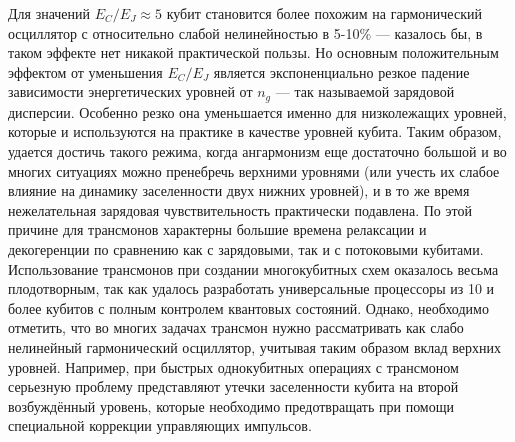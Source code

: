 Для значений $E_C/E_J \approx 5$ кубит становится более похожим на гармонический осциллятор с относительно слабой нелинейностью в 5-10\% --- казалось бы, в таком эффекте нет никакой практической пользы. Но основным положительным эффектом от уменьшения $E_C/E_J$ является экспоненциально резкое падение зависимости энергетических уровней от $n_g$ --- так называемой зарядовой дисперсии. Особенно резко она уменьшается именно для низколежащих уровней, которые и используются на практике в качестве уровней кубита. Таким образом, удается достичь такого режима, когда ангармонизм еще достаточно большой и во многих ситуациях можно пренебречь верхними уровнями (или учесть их слабое влияние на динамику заселенности двух нижних уровней), и в то же время нежелательная зарядовая чувствительность практически подавлена. По этой причине для трансмонов характерны большие времена релаксации и декогеренции по сравнению как с зарядовыми, так и с потоковыми кубитами. Использование трансмонов при создании многокубитных схем оказалось весьма плодотворным, так как удалось разработать универсальные процессоры из 10 и более кубитов с полным контролем квантовых состояний. Однако, необходимо отметить, что во многих задачах трансмон нужно рассматривать как слабо нелинейный гармонический осциллятор, учитывая таким образом вклад верхних уровней. Например, при быстрых однокубитных операциях с трансмоном серьезную проблему представляют утечки заселенности кубита на второй возбуждённый уровень, которые необходимо предотвращать при помощи специальной коррекции управляющих импульсов. 


